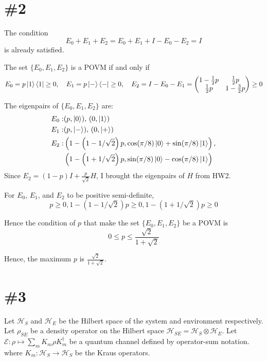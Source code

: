 \documentclass[a4paper,11pt]{article}
\begin{document}
\section{\#2}

The condition
\begin{equation}
    E_0 + E_1+E_2 = E_0 + E_1 + I - E_0 - E_2 = I
\end{equation}
is already satisfied.

The set $\{E_0, E_1, E_2\}$ is a POVM if and only if
\begin{equation}
    E_0=p\ket{1}\bra{1}\ge 0, \quad
    E_1=p\ket{-}\bra{-}\ge 0, \quad
    E_2=I-E_0-E_1=\begin{pmatrix}
        1 -\frac{1}{2}p& \frac{1}{2}p\\
        \frac{1}{2}p & 1 - \frac{3}{2}p
    \end{pmatrix}\ge 0
\end{equation}

The eigenpairs of $\{E_0, E_1, E_2\}$ are:
\begin{align}
    E_0:&(p,\ket{0}),\, (0,\ket{1})\\
    E_1:&(p,\ket{-}),\, (0,\ket{+})\\
    E_2:&\left(1-\left(1-1/\sqrt{2}\right)p, \cos(\pi/8)\ket{0} + \sin(\pi/8)\ket{1}\right),\\
        &\left(1-\left(1+1/\sqrt{2}\right)p, \sin(\pi/8)\ket{0} - \cos(\pi/8)\ket{1}\right)
\end{align}
Since $E_2=(1-p)I + \frac{p}{\sqrt{2}}H$, I brought the eigenpairs of $H$ from HW2.

For $E_0$, $E_1$, and $E_2$ to be positive semi-definite, 
\begin{equation}
    p\ge 0, 1-\left(1-1/\sqrt{2}\right)p\ge0, 1-\left(1+1/\sqrt{2}\right)p\ge0
\end{equation}

Hence the condition of $p$ that make the set $\{E_0, E_1, E_2\}$ be a POVM is
\begin{equation}
    0\le p \le \frac{\sqrt{2}}{1+\sqrt{2}}
\end{equation}

Hence, the maximum $p$ is $\frac{\sqrt{2}}{1+\sqrt{2}}$.

\section{\#3}

Let $\mathcal H_S$ and $\mathcal H_E$ be the Hilbert space of the system and environment respectively. Let $\rho_{SE}$ be a density operator on the Hilbert space $\mathcal H_{SE}=\mathcal H_S\otimes\mathcal H_E$. Let $\mathcal E:\rho\mapsto\sum_m K_m\rho K_m^\dagger$ be a quantum channel defined by operator-sum notation. where $K_m:\mathcal H_S\rightarrow \mathcal H_S$ be the Kraus operators.
\end{document}
